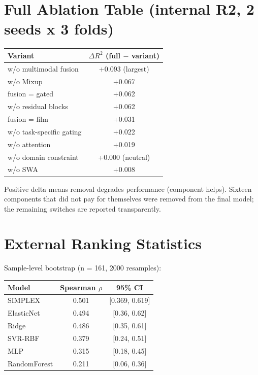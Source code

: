 \documentclass[utf8]{frontiers_suppmat}
\begin{document}
\section{Full Ablation Table (internal R2, 2 seeds x 3 folds)}

\begin{table}[h]
\centering
\begin{tabular}{lc}
\toprule
Variant & $\Delta R^2$ (full $-$ variant) \\
\midrule
w/o multimodal fusion & +0.093 (largest) \\
w/o Mixup & +0.067 \\
fusion = gated & +0.062 \\
w/o residual blocks & +0.062 \\
fusion = film & +0.031 \\
w/o task-specific gating & +0.022 \\
w/o attention & +0.019 \\
w/o domain constraint & +0.000 (neutral) \\
w/o SWA & +0.008 \\
\bottomrule
\end{tabular}
\end{table}

Positive delta means removal degrades performance (component helps). Sixteen
components that did not pay for themselves were removed from the final model;
the remaining switches are reported transparently.

\section{External Ranking Statistics}

Sample-level bootstrap (n = 161, 2000 resamples):
\begin{table}[h]
\centering
\begin{tabular}{lcc}
\toprule
Model & Spearman $\rho$ & 95\% CI \\
\midrule
SIMPLEX & 0.501 & [0.369, 0.619] \\
ElasticNet & 0.494 & [0.36, 0.62] \\
Ridge & 0.486 & [0.35, 0.61] \\
SVR-RBF & 0.379 & [0.24, 0.51] \\
MLP & 0.315 & [0.18, 0.45] \\
RandomForest & 0.211 & [0.06, 0.36] \\
\bottomrule
\end{tabular}
\end{table}
\end{document}
